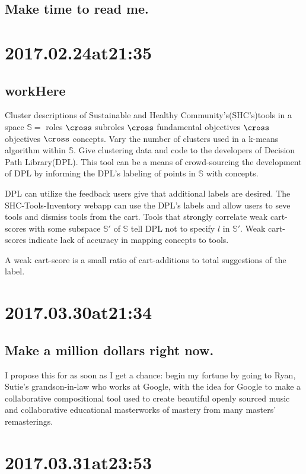 \subsection*{ Make time to read me. }

\section*{ 2017.02.24at21:35 }
\subsection*{ workHere }
Cluster descriptions of Sustainable and Healthy Community's(SHC's)tools in a space $\mathbb{S}=$ roles $\cross$ subroles $\cross$ fundamental objectives $\cross$ objectives $\cross$ concepts. Vary the number of clusters used in a k-means algorithm within $\mathbb{S}$. Give clustering data and code to the developers of Decision Path Library(DPL). This tool can be a means of crowd-sourcing the development of DPL by informing the DPL's labeling of points in $\mathbb{S}$ with concepts.

DPL can utilize the feedback users give that additional labels are desired. The SHC-Tools-Inventory webapp can use the DPL's labels and allow users to seve tools and dismiss tools from the cart. Tools that strongly correlate weak cart-scores with some subspace $\mathbb{S}'$ of $\mathbb{S}$ tell DPL not to specify $l$ in $\mathbb{S}'$. Weak cart-scores indicate lack of accuracy in mapping concepts to tools. 

A weak cart-score is a small ratio of cart-additions to total suggestions of the label.

\section*{ 2017.03.30at21:34 }
\subsection*{ Make a million dollars right now. }
I propose this for as soon as I get a chance: begin my fortune by going to Ryan, Sutie's grandson-in-law who works at Google, with the idea for Google to make a collaborative compositional tool used to create beautiful openly sourced music and collaborative educational masterworks of mastery from many masters' remasterings.

\section*{ 2017.03.31at23:53 }
